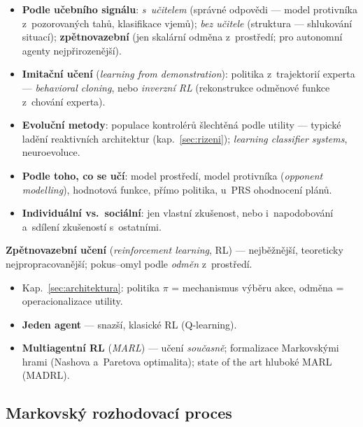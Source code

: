 \documentclass[11pt,a4paper]{article}
\theoremstyle{definition}
\begin{document}
\begin{defbox}
\begin{itemize}
\item \textbf{Podle učebního signálu}: \emph{s~učitelem} (správné odpovědi --- model
  protivníka z~pozorovaných tahů, klasifikace vjemů); \emph{bez učitele} (struktura ---
  shlukování situací); \textbf{zpětnovazební} (jen skalární odměna z~prostředí; pro autonomní
  agenty nejpřirozenější).
\item \textbf{Imitační učení} (\emph{learning from demonstration}): politika z~trajektorií
  experta --- \emph{behavioral cloning}, nebo \emph{inverzní RL} (rekonstrukce odměnové funkce
  z~chování experta).
\item \textbf{Evoluční metody}: populace kontrolérů šlechtěná podle utility --- typické ladění
  reaktivních architektur (kap.~\ref{sec:rizeni}); \emph{learning classifier systems},
  neuroevoluce.
\item \textbf{Podle toho, co se učí}: model prostředí, model protivníka (\emph{opponent
  modelling}), hodnotová funkce, přímo politika, u~PRS ohodnocení plánů.
\item \textbf{Individuální vs.\ sociální}: jen vlastní zkušenost, nebo i~napodobování
  a~sdílení zkušeností s~ostatními.
\end{itemize}
\end{defbox}

\textbf{Zpětnovazební učení} (\emph{reinforcement learning}, RL) --- nejběžnější,
teoreticky nejpropracovanější; pokus--omyl podle \emph{odměn} z~prostředí.
\begin{itemize}
\item Kap.~\ref{sec:architektura}: politika $\pi$ = mechanismus výběru akce, odměna
  = operacionalizace utility.
\item \textbf{Jeden agent} --- snazší, klasické RL (Q-learning).
\item \textbf{Multiagentní RL} (\emph{MARL}) --- učení \emph{současně}; formalizace Markovskými
  hrami (Nashova a~Paretova optimalita); state of the art hluboké MARL (MADRL).
\end{itemize}
\subsection{Markovský rozhodovací proces}
\end{document}
